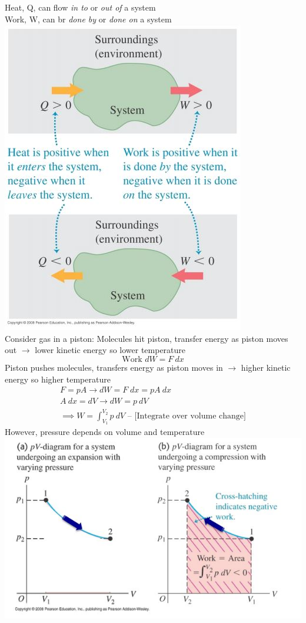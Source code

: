 \documentclass[a4paper, 11pt, fleqn, normalem]{report}
\begin{document}
Heat, Q, can flow \emph{in to} or \emph{out of} a system \\
Work, W, can br \emph{done by} or \emph{done on} a system \\
\includegraphics{ThermoSystem.jpg} \\
Consider gas in a piston:
Molecules hit piston, transfer energy as piston moves out $\rightarrow$ lower kinetic energy so lower temperature
\begin{equation*}
	\text{Work } dW = F\:dx
\end{equation*}
Piston pushes molecules, transfers energy as piston moves in $\rightarrow$ higher kinetic energy so higher temperature
\begin{gather*}
	F = pA \rightarrow dW = F\;dx = pA\:dx \\
	A\:dx = dV \rightarrow dW = p\:dV \\
	\implies W = \int_{V_{1}}^{V_{2}} p\:dV \text{ -- [Integrate over volume change]}
\end{gather*}
However, pressure depends on volume and temperature \\
\includegraphics[scale=0.8]{pV.jpg} \\
\end{document}
